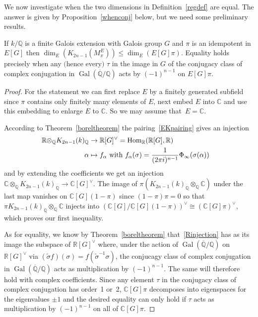 \documentclass{amsart}
\begin{document}
We now investigate when the two dimensions in Definition~\ref{regdef} are equal.  The answer is given by Proposition~\ref{whenconj} below, but
we need some preliminary results.

\begin{proposition}\label{kerisreal}
If $ k/{\mathbb Q} $ is a finite Galois extension with Galois group $ G $ and $ \pi $ is an idempotent in $ E[G] $ then
$ \dim_E ({{K_{2n-1}(M_\pi^E)}}) \le \dim_E (E[G] \pi) $.  Equality holds precisely when any $($hence every$)$ $ {\tau} $
in the image in $ G $ of the conjugacy class of complex conjugation in $ {\operatorname{Gal}}({\overline{\mathbb Q}}/{\mathbb Q}) $ acts
by $ (-1)^{n-1} $ on $ E[G]\pi $.
\end{proposition}

\begin{proof}
For the statement we can first replace
$ E $ by a finitely generated subfield since $ \pi $ contains only finitely many elements of $ E $, next
embed $ E $ into $ {\mathbb C} $ and use this embedding to enlarge $ E $ to $ {\mathbb C} $.
So we may assume that~$ E={\mathbb C} $.

According to Theorem~\ref{boreltheorem} the pairing~\eqref{EKpairing}
gives an injection
\begin{equation}\label{Rinjection}
\begin{aligned}
{\mathbb R} {\otimes}_{\mathbb Q} {K_{2n-1}(k)_{\mathbb Q}} & \to {\mathbb R}[G]^\vee = {\operatorname{Hom}}_{\mathbb R}({\mathbb R}[G], {\mathbb R})
\cr
{\alpha} & \mapsto f_{\alpha} \text{ with } f_{\alpha}({\sigma}) = \frac{1}{(2 \pi i)^{n-1}} \Phi_\infty({\sigma}({\alpha}))
\end{aligned}
\end{equation}
and by extending the coefficients we get an injection $ {\mathbb C} {\otimes}_{\mathbb Q} {K_{2n-1}(k)_{\mathbb Q}} \to {\mathbb C}[G]^\vee $.
The image of $ \pi ({K_{2n-1}(k)_{\mathbb Q}}{\otimes}_{\mathbb Q} {\mathbb C}) $ under the last map vanishes on $ {\mathbb C}[G](1-\pi) $ since $ (1-\pi) \pi = 0 $
so that $ \pi {K_{2n-1}(k)_{\mathbb Q}}{\otimes}_{\mathbb Q} {\mathbb C} $ injects into $ ({\mathbb C}[G]/{\mathbb C}[G](1-\pi))^\vee {\cong} ({\mathbb C}[G]\pi)^\vee $, which proves our
first inequality.

As for equality, we know by Theorem~\ref{boreltheorem} that~\eqref{Rinjection} has as its image the subspace
of $ {\mathbb R}[G]^\vee $ where, under the action of $ {\operatorname{Gal}}({\overline{\mathbb Q}}/{\mathbb Q}) $ on
$ {\mathbb R}[G]^\vee $ via $ (\tilde {\sigma} f)({\sigma}) = f(\tilde {\sigma}^{-1}{\sigma}) $, the conjucagy class of complex conjugation in $ {\operatorname{Gal}}({\overline{\mathbb Q}}/{\mathbb Q}) $
acts as multiplication by $ (-1)^{n-1} $.
The same will therefore hold with complex coefficients.  Since any element $ {\tau} $ in the conjugacy class
of complex conjugation has order~1 or~2, $ {\mathbb C}[G] \pi $ decomposes
into eigenspaces for the eigenvalues $ \pm 1 $ and the desired equality can only hold if
$ {\tau} $ acts as multiplication by $ (-1)^{n-1} $ on all of $ {\mathbb C}[G] \pi $.
\end{proof}
\end{document}
